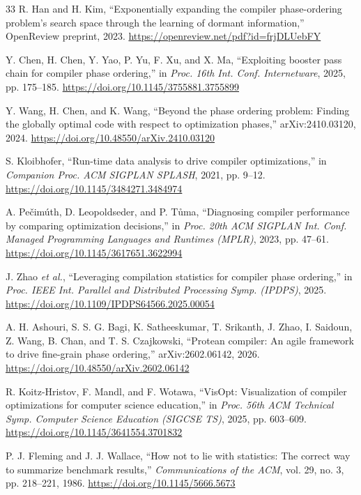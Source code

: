 \documentclass[conference]{IEEEtran}
\begin{document}
\begin{thebibliography}{33}
R. Han and H. Kim,
``Exponentially expanding the compiler phase-ordering problem's search space through the learning of dormant information,'' OpenReview preprint, 2023.
\url{https://openreview.net/pdf?id=frjDLUebFY}

Y. Chen, H. Chen, Y. Yao, P. Yu, F. Xu, and X. Ma,
``Exploiting booster pass chain for compiler phase ordering,''
in \textit{Proc. 16th Int. Conf. Internetware}, 2025, pp. 175--185.
\url{https://doi.org/10.1145/3755881.3755899}

Y. Wang, H. Chen, and K. Wang,
``Beyond the phase ordering problem: Finding the globally optimal code with respect to optimization phases,'' arXiv:2410.03120, 2024.
\url{https://doi.org/10.48550/arXiv.2410.03120}

S. Kloibhofer,
``Run-time data analysis to drive compiler optimizations,''
in \textit{Companion Proc. ACM SIGPLAN SPLASH}, 2021, pp. 9--12.
\url{https://doi.org/10.1145/3484271.3484974}

A. Pe\v{c}im\'{u}th, D. Leopoldseder, and P. T\r{u}ma,
``Diagnosing compiler performance by comparing optimization decisions,''
in \textit{Proc. 20th ACM SIGPLAN Int. Conf. Managed Programming Languages and Runtimes (MPLR)}, 2023, pp. 47--61.
\url{https://doi.org/10.1145/3617651.3622994}

J. Zhao \textit{et al.},
``Leveraging compilation statistics for compiler phase ordering,''
in \textit{Proc. IEEE Int. Parallel and Distributed Processing Symp. (IPDPS)}, 2025.
\url{https://doi.org/10.1109/IPDPS64566.2025.00054}

A. H. Ashouri, S. S. G. Bagi, K. Satheeskumar, T. Srikanth, J. Zhao, I. Saidoun, Z. Wang, B. Chan, and T. S. Czajkowski,
``Protean compiler: An agile framework to drive fine-grain phase ordering,'' arXiv:2602.06142, 2026.
\url{https://doi.org/10.48550/arXiv.2602.06142}

R. Koitz-Hristov, F. Mandl, and F. Wotawa,
``VisOpt: Visualization of compiler optimizations for computer science education,''
in \textit{Proc. 56th ACM Technical Symp. Computer Science Education (SIGCSE TS)}, 2025, pp. 603--609.
\url{https://doi.org/10.1145/3641554.3701832}

P. J. Fleming and J. J. Wallace,
``How not to lie with statistics: The correct way to summarize benchmark results,''
\textit{Communications of the ACM}, vol. 29, no. 3, pp. 218--221, 1986.
\url{https://doi.org/10.1145/5666.5673}


\end{thebibliography}
\end{document}
